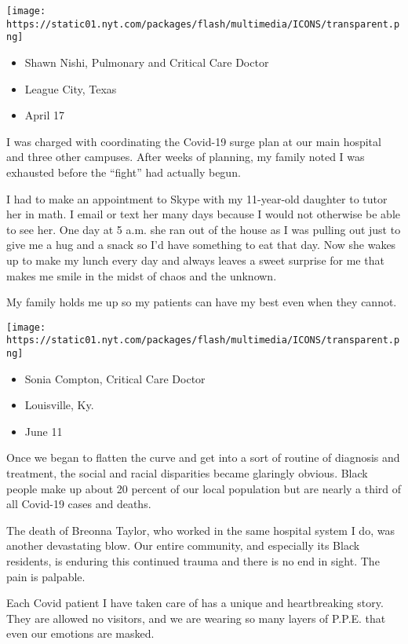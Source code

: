 \texttt{[image: https://static01.nyt.com/packages/flash/multimedia/ICONS/transparent.png]}

\begin{itemize}
\tightlist
\item
  Shawn Nishi, Pulmonary and Critical Care Doctor
\item
  League City, Texas
\item
  April 17
\end{itemize}

I was charged with coordinating the Covid-19 surge plan at our main
hospital and three other campuses. After weeks of planning, my family
noted I was exhausted before the ``fight'' had actually begun.

I had to make an appointment to Skype with my 11-year-old daughter to
tutor her in math. I email or text her many days because I would not
otherwise be able to see her. One day at 5 a.m. she ran out of the house
as I was pulling out just to give me a hug and a snack so I'd have
something to eat that day. Now she wakes up to make my lunch every day
and always leaves a sweet surprise for me that makes me smile in the
midst of chaos and the unknown.

My family holds me up so my patients can have my best even when they
cannot.

\texttt{[image: https://static01.nyt.com/packages/flash/multimedia/ICONS/transparent.png]}

\begin{itemize}
\tightlist
\item
   Sonia Compton, Critical Care Doctor
\item
  Louisville, Ky.
\item
  June 11
\end{itemize}

Once we began to flatten the curve and get into a sort of routine of
diagnosis and treatment, the social and racial disparities became
glaringly obvious. Black people make up about 20 percent of our local
population but are nearly a third of all Covid-19 cases and deaths.

The death of Breonna Taylor, who worked in the same hospital system I
do, was another devastating blow. Our entire community, and especially
its Black residents, is enduring this continued trauma and there is no
end in sight. The pain is palpable.

Each Covid patient I have taken care of has a unique and heartbreaking
story. They are allowed no visitors, and we are wearing so many layers
of P.P.E. that even our emotions are masked.

